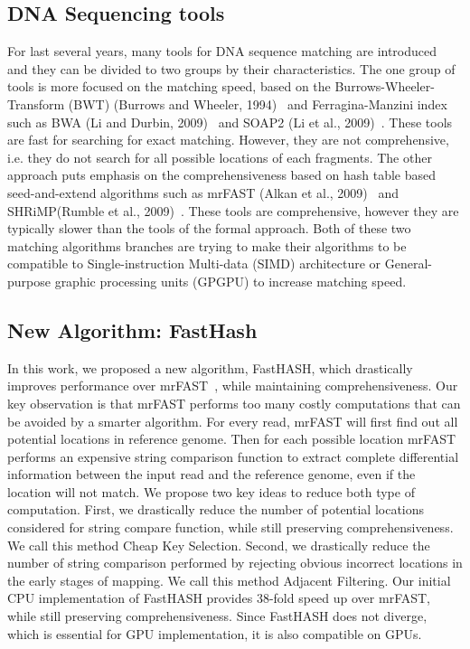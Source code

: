 \subsection{DNA Sequencing tools} For last several years, many tools for DNA
sequence matching are introduced~\cite{tools} and they can be divided to two
groups by their characteristics. The one group of tools is more focused on the
matching speed, based on the Burrows-Wheeler-Transform (BWT) (Burrows and
Wheeler, 1994)~\cite{Burrows94ablock-sorting} and Ferragina-Manzini
index~\cite{Ferragina07compressedrepresentations} such as BWA (Li and Durbin,
2009)~\cite{bwa} and SOAP2 (Li et al., 2009)~\cite{soap2}. These tools are fast
for searching for exact matching. However, they are not comprehensive, i.e.
they do not search for all possible locations of each fragments. The other
approach puts emphasis on the comprehensiveness based on hash table based
seed-and-extend algorithms such as mrFAST (Alkan et al., 2009)~\cite{mrFast}
and SHRiMP(Rumble et al., 2009)~\cite{shrimp}. These tools are comprehensive,
however they are typically slower than the tools of the formal approach. Both
of these two matching algorithms branches are trying to make their algorithms
to be compatible to Single-instruction Multi-data (SIMD) architecture or
General-purpose graphic processing units (GPGPU) to increase matching speed. \\

\subsection{New Algorithm: FastHash} In this work, we proposed a new algorithm,
FastHASH, which drastically improves performance over mrFAST~\cite{mrFast},
while maintaining comprehensiveness. Our key observation is that mrFAST
performs too many costly computations that can be avoided by a smarter
algorithm.  For every read, mrFAST will first find out all potential locations
in reference genome. Then for each possible location mrFAST performs an
expensive string comparison function to extract complete differential
information between the input read and the reference genome, even if the
location will not match. We propose two key ideas to reduce both type of
computation. First, we drastically reduce the number of potential locations
considered for string compare function, while still preserving
comprehensiveness. We call this method Cheap Key Selection. Second, we
drastically reduce the number of string comparison performed by rejecting
obvious incorrect locations in the early stages of mapping. We call this method
Adjacent Filtering. Our initial CPU implementation of FastHASH provides 38-fold
speed up over mrFAST, while still preserving comprehensiveness. Since FastHASH
does not diverge, which is essential for GPU implementation, it is also
compatible on GPUs. \\

